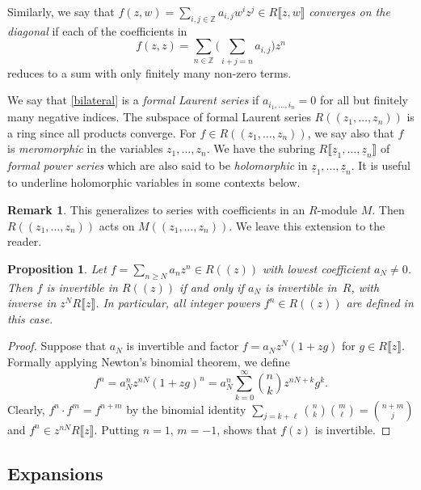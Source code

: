 \documentclass[pdftex]{sigma}
\numberwithin{equation}{section}
\newtheorem{Proposition}[Theorem]{Proposition}
\theoremstyle{definition}
\newtheorem{Remark}[Theorem]{Remark}
\def\lb{\llbracket}
\def\rb{\rrbracket}
\begin{document}
Similarly, we say that $f(z,w)=\sum_{i,j\in\mathbb{Z}} a_{i,j}w^iz^j\in R\lb z,w\rb$ \emph{converges on the diagonal} if each of the coefficients in
\[
 f(z,z)=\sum_{n\in\mathbb{Z}} \Biggl(\sum_{i+j=n} a_{i,j}\Biggr)z^n
\]
reduces to a sum with only finitely many non-zero terms.

We say that \eqref{bilateral} is a \emph{formal Laurent series} if $a_{i_1,\dots, i_n}=0$ for all but finitely many negative indices. The subspace of formal Laurent series
$
 R(\!( z_1,\dots,z_n)\!)
$
is a ring since all products converge. For $f\in R(\!( z_1,\dots,z_n)\!) $, we say also that $f$ is \emph{meromorphic} in the variables $z_1,\dots, z_n$. We have the subring
$
 R\lb \underline{z}_1,\dots,\underline{z}_n\rb
$
of \emph{formal power series} which are also said to be \emph{holomorphic} in $\underline{z}_1,\dots, \underline{z}_n$. It is useful to underline holomorphic variables in some contexts below.

\begin{Remark}
This generalizes to series with coefficients in an $R$-module $M$. Then $R(\!( z_1,\dots, z_n)\!)$ acts on $M(\!( z_1,\dots, z_n)\!)$. We leave this extension to the reader.
\end{Remark}

\begin{Proposition}
\label{Laurent-invbar}
 Let $f=\sum_{n\geqslant N} a_nz^n\in R(\!( z)\!) $ with lowest coefficient $a_N\neq0$. Then $f$ is invertible in $R(\!( z)\!) $ if and only if $a_N$ is invertible in~$R$, with inverse in $z^N R\lb z\rb$. In particular, all integer powers $f^n\in R(\!( z)\!) $ are defined in this case.
\end{Proposition}

\begin{proof}
 Suppose that $a_N$ is invertible and factor $f=a_Nz^N(1+zg)$ for $g\in R\lb z\rb$. Formally applying Newton's binomial theorem, we define
 \begin{equation}
 \label{eqn:newton-inverse}
 f^n=a_N^nz^{nN}(1+zg)^n=a_N^n\sum_{k=0}^\infty\binom{n}{k}z^{nN+k} g^k.
 \end{equation}
 Clearly, $f^n\cdot f^m = f^{n+m}$ by the binomial identity $\sum_{j=k+\ell}\binom{n}{k}\binom{m}{\ell}=\binom{n+m}{j}$ and $f^n\in z^{nN}R\lb z\rb$. Putting $n=1$, $m=-1$, shows that $f(z)$ is invertible.
\end{proof}

\subsection{Expansions}
\label{s32}
\end{document}
